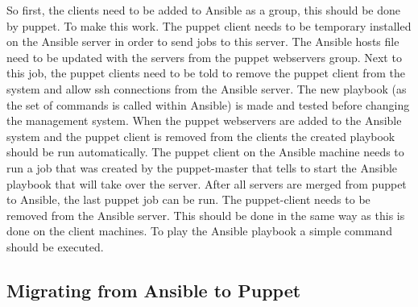 So first, the clients need to be added to Ansible as a group, this should be done by puppet. To make this work. The puppet client needs to be temporary installed on the Ansible server in order to send jobs to this server. The Ansible hosts file need to be updated with the servers from the puppet webservers group. Next to this job, the puppet clients need to be told to remove the puppet client from the system and allow ssh connections from the Ansible server. The new playbook (as the set of commands is called within Ansible) is made and tested before changing the management system. When the puppet webservers are added to the Ansible system and the puppet client is removed from the clients the created playbook should be run automatically. The puppet client on the Ansible machine needs to run a job that was created by the puppet-master that tells to start the Ansible playbook that will take over the server. After all servers are merged from puppet to Ansible, the last puppet job can be run. The puppet-client needs to be removed from the Ansible server. This should be done in the same way as this is done on the client machines. To play the Ansible playbook a simple command should be executed. 



\subsection{Migrating from Ansible to Puppet}\label{subsec:ansibletopuppet}




